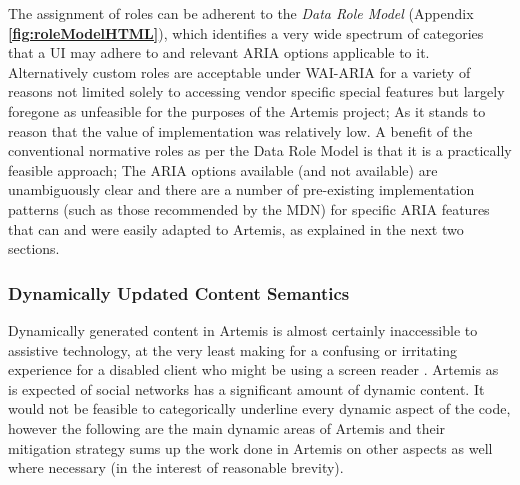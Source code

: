 The assignment of roles can be adherent to the \textit{Data Role Model} (Appendix \textbf{\ref{fig:roleModelHTML}}), which identifies a very wide spectrum of categories that a UI may adhere to and relevant ARIA options applicable to it. Alternatively custom roles are acceptable under WAI-ARIA for a variety of reasons not limited solely to accessing vendor specific special features \cite{W3C2014,CraigJamesH,MDN} but largely foregone as unfeasible for the purposes of the Artemis project; As it stands to reason that the value of implementation was relatively low. A benefit of  the conventional normative roles as per the Data Role Model is that it is a  practically feasible approach; The ARIA options available (and not available) are unambiguously clear and there are a number of pre-existing implementation patterns (such as those recommended by the MDN) for specific ARIA features that can and were easily adapted to Artemis, as explained in the next two sections.

\subsubsection{Dynamically Updated Content Semantics}


Dynamically generated content in Artemis is almost certainly inaccessible to assistive technology, at the very least making for a confusing or irritating experience for a disabled client who might be using a screen reader \cite{MozillaDeveloperNetwork,MozillaDeveloperNetworkb,MozillaDeveloperNetworkc}. Artemis as is expected of social networks has a significant amount of dynamic content. It would not be feasible to categorically underline every dynamic aspect of the  code, however the following are the main dynamic areas of Artemis and their mitigation strategy sums up the work done in Artemis on other aspects as well where necessary (in the interest of reasonable brevity).


